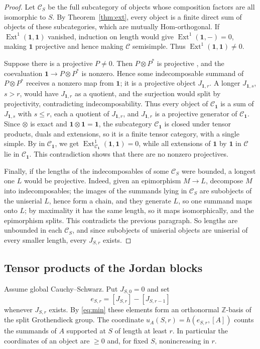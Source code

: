 \documentclass[11pt,reqno]{amsart}
\theoremstyle{definition}
\newcommand{\Ext}{\operatorname{Ext}}
\newcommand{\one}{\mathbf 1}
\newcommand{\C}{\mathcal C}
\newcommand{\ZZ}{\mathbb Z}
\begin{document}
\begin{proof}
Let $\C_S$ be the full subcategory of objects whose composition factors are all isomorphic to $S$. By Theorem~\ref{thm:ext}, every object is a finite direct sum of objects of these subcategories, which are mutually Hom-orthogonal. If $\Ext^1(\one,\one)$ vanished, induction on length would give $\Ext^1(\one,-)=0$, making $\one$ projective and hence making $\C$ semisimple. Thus $\Ext^1(\one,\one)\neq0$.

Suppose there is a projective $P\neq0$. Then $P\otimes P^*$ is projective \cite[Proposition~4.2.12]{EGNO}, and the coevaluation $\one\to P\otimes P^*$ is nonzero. Hence some indecomposable summand of $P\otimes P^*$ receives a nonzero map from $\one$; it is a projective object $J_{\one,r}$. A longer $J_{\one,s}$, $s>r$, would have $J_{\one,r}$ as a quotient, and the surjection would split by projectivity, contradicting indecomposability. Thus every object of $\C_\one$ is a sum of $J_{\one,s}$ with $s\leq r$, each a quotient of $J_{\one,r}$, and $J_{\one,r}$ is a projective generator of $\C_\one$. Since $\otimes$ is exact and $\one\otimes\one=\one$, the subcategory $\C_\one$ is closed under tensor products, duals and extensions, so it is a finite tensor category, with a single simple. By \cite[Theorem~4.4.1]{EGNO} in $\C_\one$, we get $\Ext^1_{\C_\one}(\one,\one)=0$, while all extensions of $\one$ by $\one$ in $\C$ lie in $\C_\one$. This contradiction shows that there are no nonzero projectives.

Finally, if the lengths of the indecomposables of some $\C_S$ were bounded, a longest one $L$ would be projective. Indeed, given an epimorphism $M\to L$, decompose $M$ into indecomposables; the images of the summands lying in $\C_S$ are subobjects of the uniserial $L$, hence form a chain, and they generate $L$, so one summand maps onto $L$; by maximality it has the same length, so it maps isomorphically, and the epimorphism splits. This contradicts the previous paragraph. So lengths are unbounded in each $\C_S$, and since subobjects of uniserial objects are uniserial of every smaller length, every $J_{S,r}$ exists.
\end{proof}

\subsection{Tensor products of the Jordan blocks}
Assume global Cauchy--Schwarz. Put $J_{S,0}=0$ and set
\[
 e_{S,r}=[J_{S,r}]-[J_{S,r-1}]
\]
whenever $J_{S,r}$ exists. By \eqref{eq:min} these elements form an orthonormal
$\ZZ$-basis of the split Grothendieck group. The coordinate
$u_A(S,r)=h(e_{S,r},[A])$ counts the summands of $A$ supported at $S$ of length
at least $r$. In particular the coordinates of an object are $\geq0$ and,
for fixed $S$, nonincreasing in $r$.
\end{document}

